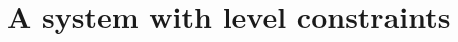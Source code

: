 \documentclass[11pt,a4paper]{article}
\theoremstyle{definition}
\def\NN{\mathsf{N}}
\begin{document}


\section{A system with level constraints}\label{sec:constraints}
\end{document}
